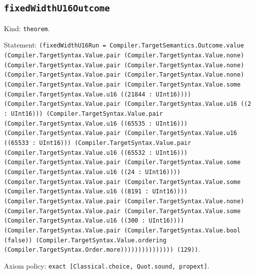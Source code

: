 \documentclass[11pt]{article}
\begin{document}
\subsection*{\texttt{fixedWidthU16Outcome}}
\noindent Kind: \texttt{theorem}.\par
\noindent Statement: \texttt{(fixedWidthU16Run = Compiler.TargetSemantics.Outcome.value (Compiler.TargetSyntax.Value.pair (Compiler.TargetSyntax.Value.none) (Compiler.TargetSyntax.Value.pair (Compiler.TargetSyntax.Value.none) (Compiler.TargetSyntax.Value.pair (Compiler.TargetSyntax.Value.none) (Compiler.TargetSyntax.Value.pair (Compiler.TargetSyntax.Value.some (Compiler.TargetSyntax.Value.u16 ((21844 : UInt16)))) (Compiler.TargetSyntax.Value.pair (Compiler.TargetSyntax.Value.u16 ((2 : UInt16))) (Compiler.TargetSyntax.Value.pair (Compiler.TargetSyntax.Value.u16 ((65535 : UInt16))) (Compiler.TargetSyntax.Value.pair (Compiler.TargetSyntax.Value.u16 ((65533 : UInt16))) (Compiler.TargetSyntax.Value.pair (Compiler.TargetSyntax.Value.u16 ((65532 : UInt16))) (Compiler.TargetSyntax.Value.pair (Compiler.TargetSyntax.Value.some (Compiler.TargetSyntax.Value.u16 ((24 : UInt16)))) (Compiler.TargetSyntax.Value.pair (Compiler.TargetSyntax.Value.some (Compiler.TargetSyntax.Value.u16 ((8191 : UInt16)))) (Compiler.TargetSyntax.Value.pair (Compiler.TargetSyntax.Value.none) (Compiler.TargetSyntax.Value.pair (Compiler.TargetSyntax.Value.some (Compiler.TargetSyntax.Value.u16 ((300 : UInt16)))) (Compiler.TargetSyntax.Value.pair (Compiler.TargetSyntax.Value.bool (false)) (Compiler.TargetSyntax.Value.ordering (Compiler.TargetSyntax.Order.more))))))))))))))) (129))}.\par
\noindent Axiom policy: \texttt{exact [Classical.choice, Quot.sound, propext]}.\par
\end{document}
